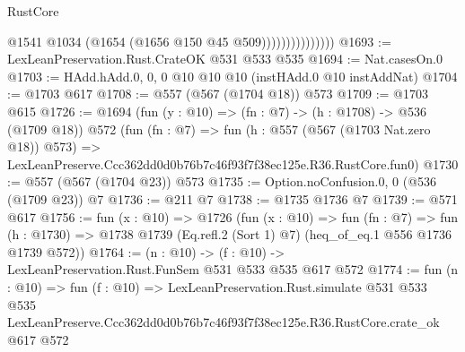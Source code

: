 \begin{lexlean}{RustCore}
\begin{coremodule}
                              @1541
                              @1034
                              (@1654 (@1656 @150 @45 @509)))))))))))))))
@1693 := LexLeanPreservation.Rust.CrateOK @531 @533 @535
@1694 := Nat.casesOn.{0}
@1703 := HAdd.hAdd.{0, 0, 0} @10 @10 @10 (instHAdd.{0} @10 instAddNat)
@1704 := @1703 @617
@1708 := @557 (@567 (@1704 @18)) @573
@1709 := @1703 @615
@1726 := @1694
    (fun (y : @10) => (fn : @7) -> (h : @1708) -> @536 (@1709 @18))
    @572
    (fun (fn : @7) =>
    fun (h : @557 (@567 (@1703 Nat.zero @18)) @573) =>
    LexLeanPreserve.Ccc362dd0d0b76b7c46f93f7f38ec125e.R36.RustCore.fun0)
@1730 := @557 (@567 (@1704 @23)) @573
@1735 := Option.noConfusion.{0, 0} (@536 (@1709 @23)) @7
@1736 := @211 @7
@1738 := @1735 @1736 @7
@1739 := @571 @617
@1756 := fun (x : @10) =>
  @1726
    (fun (x : @10) =>
    fun (fn : @7) =>
    fun (h : @1730) => @1738 @1739 (Eq.refl.{2} (Sort 1) @7) (heq_of_eq.{1} @556 @1736 @1739 @572))
@1764 := (n : @10) -> (f : @10) -> LexLeanPreservation.Rust.FunSem @531 @533 @535 @617 @572
@1774 := fun (n : @10) =>
  fun (f : @10) =>
  LexLeanPreservation.Rust.simulate
    @531
    @533
    @535
    LexLeanPreserve.Ccc362dd0d0b76b7c46f93f7f38ec125e.R36.RustCore.crate_ok
    @617
    @572
\end{coremodule}
\end{lexlean}
